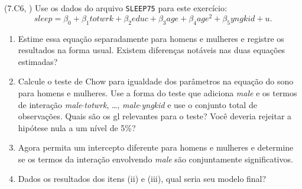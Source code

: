 \documentclass[12pt,letterpaper, onecolumn]{exam}
\begin{document}
\begin{questions}
\question\qstar (7.C6, \citep{wooldridge2016}) Use os dados do arquivo \texttt{SLEEP75} para este exercício:
\[
sleep = \beta_0 + \beta_1 totwrk + \beta_2 educ + \beta_3 age + \beta_4 age^2 + \beta_5 yngkid + u.
\]
\begin{enumerate}[label=(\roman*)]
    \item Estime essa equação separadamente para homens e mulheres e registre os resultados na forma usual. Existem diferenças notáveis nas duas equações estimadas?
    \item Calcule o teste de Chow para igualdade dos parâmetros na equação do sono para homens e mulheres. Use a forma do teste que adiciona \textit{male} e os termos de interação \textit{male}$\cdot$\textit{totwrk}, \ldots, \textit{male}$\cdot$\textit{yngkid} e use o conjunto total de observações. Quais são os gl relevantes para o teste? Você deveria rejeitar a hipótese nula a um nível de 5\%?
    \item Agora permita um intercepto diferente para homens e mulheres e determine se os termos da interação envolvendo \textit{male} são conjuntamente significativos.
    \item Dados os resultados dos itens (ii) e (iii), qual seria seu modelo final?
\end{enumerate}

\end{questions}



\end{document}
